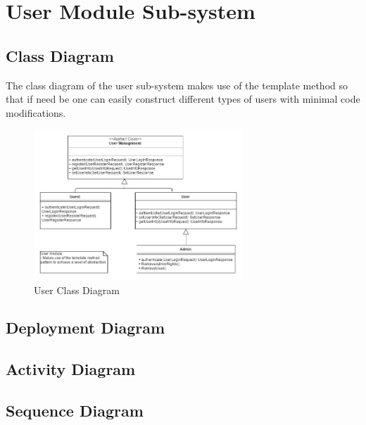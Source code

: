 
\section{User Module Sub-system}
\subsection{Class Diagram}
The class diagram of the user sub-system makes use of the template method so that if need be one can easily construct different types of users with minimal code modifications.

\begin{figure}[H]
	\centering
	\includegraphics[width=0.7\textwidth]{user/img/UserClassDiagram.jpg}
	\caption{User Class Diagram}
\end{figure}



\subsection{Deployment Diagram}

\begin{figure}[H]
\end{figure}


\subsection{Activity Diagram}

\begin{figure}[H]
\end{figure}


\subsection{Sequence Diagram}


